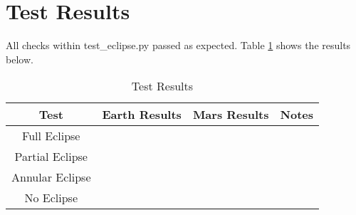 \section{Test Results}

All checks within test\_eclipse.py passed as expected. Table \ref{tab:TestResults} shows the results below.
\begin{table}[H]
	\caption{Test Results}
	\label{tab:TestResults}
	\centering \fontsize{10}{10}\selectfont
	\begin{tabular}{c|c|c|c}
		\hline \textbf{Test} & \textbf{Earth Results} & \textbf{Mars Results} & Notes\\
		\hline 
		Full Eclipse &  &    	   & \\
		Partial Eclipse &  & & \\
		Annular Eclipse &  &  &  \\	
		No Eclipse &  &  	   & \\
		\hline
	\end{tabular}
\end{table}
